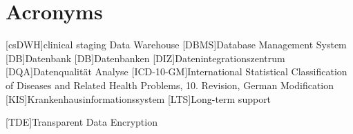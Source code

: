 \chapter*{Acronyms}
    \begin{acronym}[CDW]
    	
    	[csDWH]{clinical staging Data Warehouse}
    	[DBMS]{Database Management System}
    	[DB]{Datenbank}
    	[DB]{Datenbanken}
    	[DIZ]{Datenintegrationszentrum}
    	[DQA]{Datenqualität Analyse}
    	[ICD-10-GM]{International Statistical Classification of Diseases and Related Health Problems, 10. Revision, German Modification}
    	[KIS]{Krankenhausinformationssystem}
    	[LTS]{Long-term support}
    	
    	
    	[TDE]{Transparent Data Encryption}
    	
    	
    \end{acronym}    